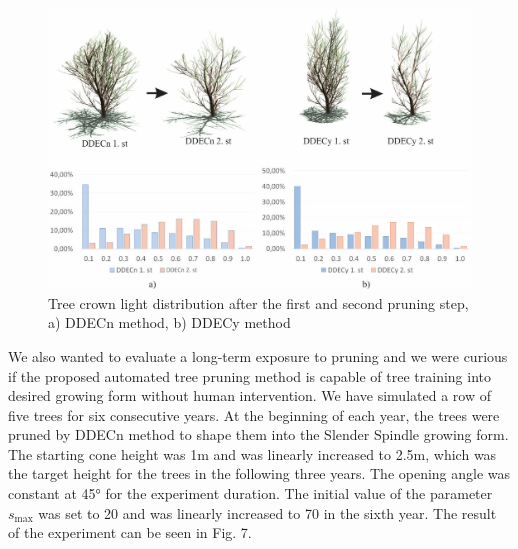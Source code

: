 \documentclass[1p]{elsarticle}
\begin{document}
\begin{figure}
    \centering
    \includegraphics[width=5.4in]{figs/image6.jpeg}
    \caption{Tree crown light distribution after the first and
second pruning step, a) DDECn method, b) DDECy method}
    \label{fig:my_label}
\end{figure}



We also wanted to evaluate a long-term exposure to pruning and we were
curious if the proposed automated tree pruning method is capable of tree
training into desired growing form without human intervention. We have
simulated a row of five trees for six consecutive years. At the
beginning of each year, the trees were pruned by DDECn method to shape
them into the Slender Spindle growing form. The starting cone height was
1m and was linearly increased to 2.5m, which was the target height for
the trees in the following three years. The opening angle was constant
at 45° for the experiment duration. The initial value of the parameter
\(s_{\mathrm{\max}}\) was set to 20 and was linearly increased to 70 in
the sixth year. The result of the experiment can be seen in Fig. 7.
\end{document}
